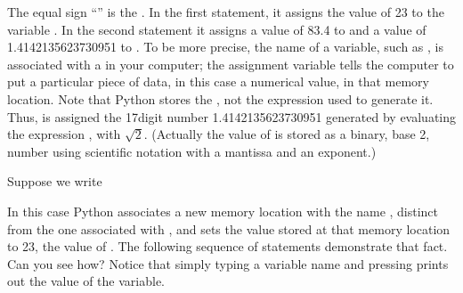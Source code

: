 \documentclass[letterpaper,10pt,english]{sphinxmanual}
\begin{document}
\begin{sphinxVerbatim}[commandchars=\\\{\}]
  

    
\end{sphinxVerbatim}

\sphinxAtStartPar
The equal sign “\sphinxcode{\sphinxupquote{=}}” is the .  In the first statement, it assigns the value of 23 to the variable .  In the second statement it assigns a value of 83.4 to  and a value of 1.4142135623730951 to .  To be more precise, the name of a variable, such as , is associated with a  in your computer; the assignment variable tells the computer to put a particular piece of data, in this case a numerical value, in that memory location.  Note that Python stores the , not the expression used to generate it.  Thus,  is assigned the 17\sphinxhyphen{}digit number 1.4142135623730951 generated by evaluating the expression ,  with \(\sqrt{2}\).  (Actually the value of  is stored as a  binary, base 2, number using scientific notation with a mantissa and an exponent.)

\sphinxAtStartPar
Suppose we write

\begin{sphinxVerbatim}[commandchars=\\\{\}]
  
\end{sphinxVerbatim}

\sphinxAtStartPar
In this case Python associates a new memory location with the name , distinct from the one associated with , and sets the value stored at that memory location to 23, the value of .  The following sequence of statements demonstrate that fact.  Can you see how?  Notice that simply typing a variable name and pressing  prints out the value of the variable.
\end{document}
